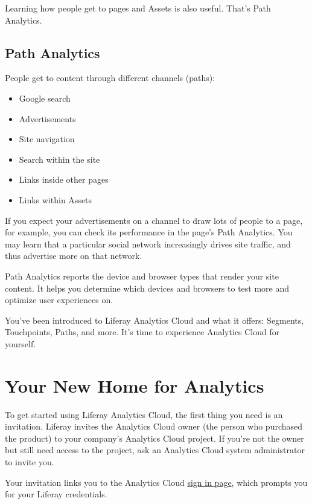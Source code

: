 Learning how people get to pages and Assets is also useful. That's Path
Analytics.

\section{Path Analytics}\label{path-analytics}

People get to content through different channels (paths):

\begin{itemize}
\tightlist
\item
  Google search
\item
  Advertisements
\item
  Site navigation
\item
  Search within the site
\item
  Links inside other pages
\item
  Links within Assets
\end{itemize}

If you expect your advertisements on a channel to draw lots of people to
a page, for example, you can check its performance in the page's Path
Analytics. You may learn that a particular social network increasingly
drives site traffic, and thus advertise more on that network.

Path Analytics reports the device and browser types that render your
site content. It helps you determine which devices and browsers to test
more and optimize user experiences on.

You've been introduced to Liferay Analytics Cloud and what it offers:
Segments, Touchpoints, Paths, and more. It's time to experience
Analytics Cloud for yourself.

\chapter{Your New Home for Analytics}\label{your-new-home-for-analytics}

To get started using Liferay Analytics Cloud, the first thing you need
is an invitation. Liferay invites the Analytics Cloud owner (the person
who purchased the product) to your company's Analytics Cloud project. If
you're not the owner but still need access to the project, ask an
Analytics Cloud system administrator to invite you.

Your invitation links you to the Analytics Cloud
\href{https://analytics.liferay.com/}{sign in page}, which prompts you
for your Liferay credentials.

